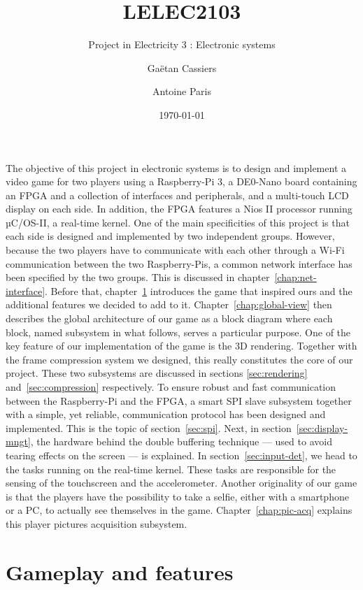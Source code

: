\documentclass[english, DIV=13]{scrreprt}
\title{LELEC2103}
\subtitle{Project in Electricity 3 : Electronic systems}
\author{Gaëtan Cassiers\and Antoine Paris}
\date{\today}
\begin{document}
\maketitle
\tableofcontents

The objective of this project in electronic systems is to design and implement a
video game for two players using a Raspberry-Pi 3, a DE0-Nano board containing an FPGA
and a collection of interfaces and peripherals, and a multi-touch LCD display on
each side. In addition, the FPGA features a Nios II processor running µC/OS-II, a
real-time kernel.
One of the main specificities of this project is that each side is designed and
implemented by two independent groups. However, because the two players have to
communicate with
each other through a Wi-Fi communication between the two Raspberry-Pis, a common
network interface has been specified by the two groups. This is discussed
in chapter~\ref{chap:net-interface}. Before that, chapter~\ref{chap:gameplay-features}
introduces the game that inspired ours and the additional features we decided to
add to it. Chapter~\ref{chap:global-view} then describes the global architecture of
our game as a block diagram where each block, named subsystem in what follows, serves a
particular purpose. One of the key feature of our implementation of the game is the
3D rendering. Together with the frame compression system we designed, this really
constitutes the core of our project. These two subsystems are discussed in sections
\ref{sec:rendering} and~\ref{sec:compression} respectively.
To ensure robust and fast communication between the Raspberry-Pi and the FPGA, a smart
SPI slave subsystem together with a simple, yet reliable, communication protocol has
been designed and implemented. This is the topic of section~\ref{sec:spi}. Next, in
section~\ref{sec:display-mngt}, the hardware behind the double buffering technique
--- used to avoid tearing effects on the screen --- is explained.
In section~\ref{sec:input-det}, we head to the tasks running on the real-time kernel.
These tasks are responsible for the sensing of the touchscreen and the accelerometer.
Another originality of our game is that the players have the possibility to take a
selfie, either with a smartphone or a PC, to actually see themselves in the game.
Chapter~\ref{chap:pic-acq} explains this player pictures acquisition subsystem.

\chapter{Gameplay and features}
\label{chap:gameplay-features}
\end{document}
